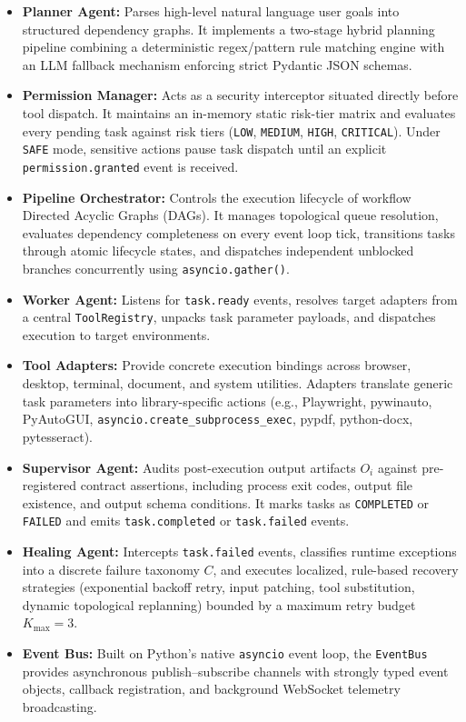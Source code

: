 \documentclass[conference]{IEEEtran}
\begin{document}
\begin{itemize}
    \item \textbf{Planner Agent:} Parses high-level natural language user goals into structured dependency graphs. It implements a two-stage hybrid planning pipeline combining a deterministic regex/pattern rule matching engine with an LLM fallback mechanism enforcing strict Pydantic JSON schemas.
    \item \textbf{Permission Manager:} Acts as a security interceptor situated directly before tool dispatch. It maintains an in-memory static risk-tier matrix and evaluates every pending task against risk tiers (\texttt{LOW}, \texttt{MEDIUM}, \texttt{HIGH}, \texttt{CRITICAL}). Under \texttt{SAFE} mode, sensitive actions pause task dispatch until an explicit \texttt{permission.granted} event is received.
    \item \textbf{Pipeline Orchestrator:} Controls the execution lifecycle of workflow Directed Acyclic Graphs (DAGs). It manages topological queue resolution, evaluates dependency completeness on every event loop tick, transitions tasks through atomic lifecycle states, and dispatches independent unblocked branches concurrently using \texttt{asyncio.gather()}.
    \item \textbf{Worker Agent:} Listens for \texttt{task.ready} events, resolves target adapters from a central \texttt{ToolRegistry}, unpacks task parameter payloads, and dispatches execution to target environments.
    \item \textbf{Tool Adapters:} Provide concrete execution bindings across browser, desktop, terminal, document, and system utilities. Adapters translate generic task parameters into library-specific actions (e.g., Playwright, pywinauto, PyAutoGUI, \texttt{asyncio.create\_subprocess\_exec}, pypdf, python-docx, pytesseract).
    \item \textbf{Supervisor Agent:} Audits post-execution output artifacts $O_i$ against pre-registered contract assertions, including process exit codes, output file existence, and output schema conditions. It marks tasks as \texttt{COMPLETED} or \texttt{FAILED} and emits \texttt{task.completed} or \texttt{task.failed} events.
    \item \textbf{Healing Agent:} Intercepts \texttt{task.failed} events, classifies runtime exceptions into a discrete failure taxonomy $C$, and executes localized, rule-based recovery strategies (exponential backoff retry, input patching, tool substitution, dynamic topological replanning) bounded by a maximum retry budget $K_{\text{max}} = 3$.
    \item \textbf{Event Bus:} Built on Python's native \texttt{asyncio} event loop, the \texttt{EventBus} provides asynchronous publish--subscribe channels with strongly typed event objects, callback registration, and background WebSocket telemetry broadcasting.
\end{itemize}
\end{document}
